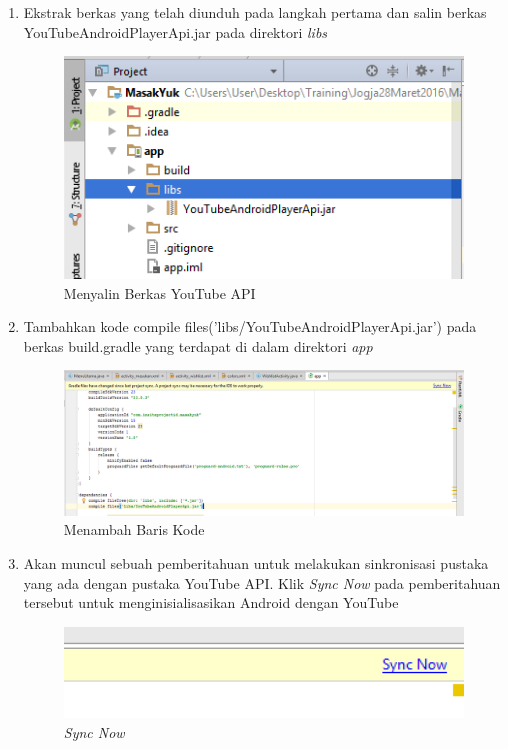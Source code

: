 \begin{enumerate}
		\item Ekstrak berkas yang telah diunduh pada langkah pertama dan salin 
		berkas YouTubeAndroidPlayerApi.jar pada direktori \textit{libs}
		\begin{figure}[H]
			\centering
			\includegraphics[width=1\textwidth]{gambar/y3}
			\caption{Menyalin Berkas YouTube API}
		\end{figure}	
		
		\item Tambahkan kode compile files('libs/YouTubeAndroidPlayerApi.jar') pada berkas build.gradle yang terdapat di dalam direktori \textit{app}
		\begin{figure}[H]
			\centering
			\includegraphics[width=1\textwidth]{gambar/y4}
			\caption{Menambah Baris Kode}
		\end{figure}
	
		\item Akan muncul sebuah pemberitahuan untuk melakukan sinkronisasi pustaka yang ada dengan pustaka YouTube API. Klik \textit{Sync Now} pada pemberitahuan tersebut untuk menginisialisasikan Android dengan YouTube
		\begin{figure}[H]
			\centering
			\includegraphics[width=1\textwidth]{gambar/y5}
			\caption{\textit{Sync Now}}
		\end{figure}
		

\end{enumerate}
